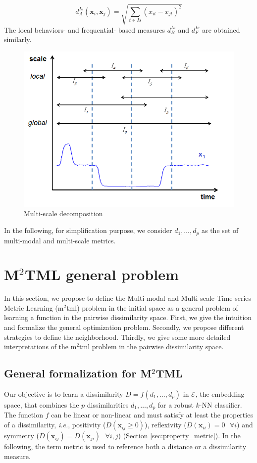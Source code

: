 \begin{equation}	
d^{Is}_A(\textbf{x}_i,\textbf{x}_j) = \sqrt{\sum\limits_{t \in Is} (x_{it}-x_{jt})^2}
\label{eq:A2}
\end{equation}
The local behaviors- and frequential- based measures $d^{Is}_B$ and $d^{Is}_F$ are obtained similarly.
\begin{figure}[h!]
	\centering
	\includegraphics[width=0.5\linewidth]{images/Intervalles3}
	\caption{Multi-scale decomposition}
	\label{fig:Intervalles}
\end{figure}
\noindent In the following, for simplification purpose, we consider $d_1, \ldots, d_p$ as the set of multi-modal and multi-scale metrics.




\section{M$^2$TML general problem}
In this section, we propose to define the Multi-modal and Multi-scale Time series Metric Learning ({\sc m$^2$tml}) problem in the initial space as a general problem of learning a function in the pairwise dissimilarity space. First, we give the intuition and formalize the general optimization problem. Secondly, we propose different strategies to define the neighborhood. Thirdly, we give some more detailed interpretations of the {\sc m$^2$tml} problem in the pairwise dissimilarity space.

\subsection{General formalization for M$^2$TML} 
Our objective is to learn a dissimilarity $D=f(d_1, \ldots, d_p)$ in $\mathcal{E}$, the embedding space, that combines the $p$ dissimilarities $d_1, \ldots, d_p$ for a robust $k$-NN classifier. The function $f$ can be linear or non-linear and must satisfy at least the properties of a dissimilarity, \textit{i.e.}, positivity ($D(\textbf{x}_{ij} \geq 0)$), reflexivity ($D(\textbf{x}_{ii})=0 \text{ }\forall i$) and symmetry ($D(\textbf{x}_{ij}) = D(\textbf{x}_{ji}) \text{ } \forall i,j$) (Section \ref{sec:property_metric}). In the following, the term metric is used to reference both a distance or a dissimilarity measure.


